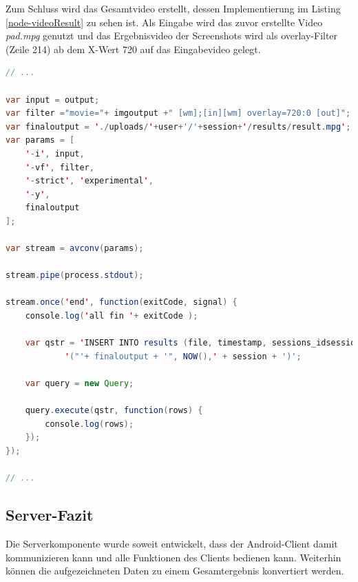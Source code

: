 Zum Schluss wird das Gesamtvideo erstellt, dessen Implementierung im Listing \ref{node-videoResult} zu sehen ist. Als Eingabe wird das zuvor erstellte Video \emph{pad.mpg} genutzt und das Ergebnisvideo der Screenshots wird als overlay-Filter (Zeile 214) ab dem X-Wert 720 auf das Eingabevideo gelegt.

\begin{lstlisting}[label=node-videoResult,language=Java, caption=Gesamtvideo kombinieren, firstnumber=211]
// ...

var input = output;
var filter ="movie="+ imgoutput +" [wm];[in][wm] overlay=720:0 [out]";
var finaloutput = './uploads/'+user+'/'+session+'/results/result.mpg';
var params = [
	'-i', input,
	'-vf', filter,
	'-strict', 'experimental',
	'-y',
	finaloutput
];

var stream = avconv(params);

stream.pipe(process.stdout);

stream.once('end', function(exitCode, signal) {
	console.log('all fin '+ exitCode );

	var qstr = 'INSERT INTO results (file, timestamp, sessions_idsessions) VALUES ' +
			'("'+ finaloutput + '", NOW(),' + session + ')';

	var query = new Query;

	query.execute(qstr, function(rows) {
		console.log(rows);
	});
});

// ...
\end{lstlisting}

\subsection{Server-Fazit}

Die Serverkomponente wurde soweit entwickelt, dass der Android-Client damit kommunizieren kann und alle Funktionen des Clients bedienen kann. Weiterhin können die aufgezeichneten Daten zu einem Gesamtergebnis konvertiert werden. 

